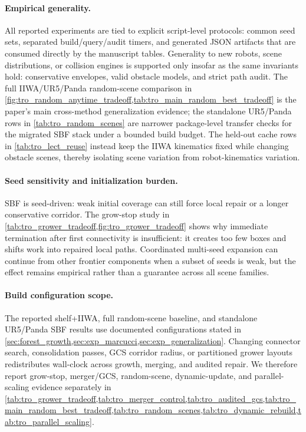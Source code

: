 \documentclass[journal]{IEEEtran}
\begin{document}
\paragraph{Empirical generality.}
All reported experiments are tied to explicit script-level protocols: common
seed sets, separated build/query/audit timers, and generated JSON artifacts
that are consumed directly by the manuscript tables. Generality to new robots,
scene distributions, or collision engines is supported only insofar as the same
invariants hold: conservative envelopes, valid obstacle models, and strict
path audit. The full IIWA/UR5/Panda random-scene comparison in
\cref{fig:tro_random_anytime_tradeoff,tab:tro_main_random_best_tradeoff} is the
paper's main cross-method generalization evidence; the standalone UR5/Panda
rows in \cref{tab:tro_random_scenes} are narrower package-level transfer checks
for the migrated SBF stack under a bounded build budget. The held-out cache
rows in \cref{tab:tro_lect_reuse} instead keep the IIWA kinematics fixed while
changing obstacle scenes, thereby isolating scene variation from
robot-kinematics variation.

\paragraph{Seed sensitivity and initialization burden.}
SBF is seed-driven: weak initial coverage can still force local repair or a
longer conservative corridor. The grow-stop study in
\cref{tab:tro_grower_tradeoff,fig:tro_grower_tradeoff} shows why immediate
termination after first connectivity is insufficient: it creates too few boxes
and shifts work into repaired local paths. Coordinated multi-seed expansion can
continue from other frontier components when a subset of seeds is weak, but the
effect remains empirical rather than a guarantee across all scene families.

\paragraph{Build configuration scope.}
The reported shelf+IIWA, full random-scene baseline, and standalone
UR5/Panda SBF results use documented configurations stated in
\cref{sec:forest_growth,sec:exp_marcucci,sec:exp_generalization}.
Changing connector search, consolidation passes, GCS corridor radius, or
partitioned grower layouts redistributes wall-clock across growth, merging, and
audited repair. We therefore report grow-stop, merger/GCS, random-scene,
dynamic-update, and parallel-scaling evidence separately in
\cref{tab:tro_grower_tradeoff,tab:tro_merger_control,tab:tro_audited_gcs,tab:tro_main_random_best_tradeoff,tab:tro_random_scenes,tab:tro_dynamic_rebuild,tab:tro_parallel_scaling}.
\end{document}
